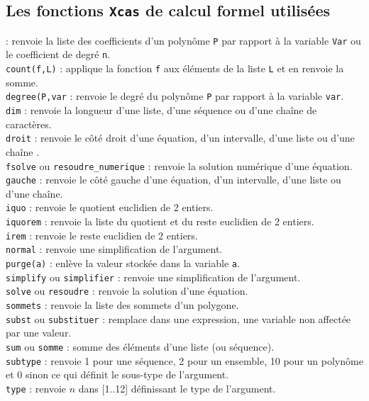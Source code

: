 \documentclass[12pt,a4paper]{book}
\begin{document}
\begin{giacjshere}
\section{Les fonctions {\tt Xcas} de calcul formel utilis\'ees}
 : renvoie la liste des coefficients d'un polynôme
{\tt P} par rapport \`a la variable {\tt Var} ou le coefficient de 
degr\'e {\tt n}.\\
{\tt count(f,L)} : applique la fonction {\tt f} aux \'el\'ements de la liste 
{\tt L} et en renvoie la somme.\\
{\tt degree(P,var} : renvoie le degr\'e du polynôme {\tt P} par rapport à la 
variable {\tt var}.\\
{\tt dim} : renvoie la longueur d'une liste, d'une s\'equence ou d'une cha\^ine de caract\`eres.\\
{\tt droit} : renvoie le c\^ot\'e droit d'une \'equation, d'un intervalle, 
d'une liste ou d'une cha\^ine .\\
{\tt fsolve} ou {\tt resoudre\_numerique} : renvoie la solution num\'erique d'une \'equation. \\
{\tt gauche} : renvoie le c\^ot\'e gauche d'une \'equation, d'un intervalle, 
d'une liste ou d'une cha\^ine.\\
{\tt iquo} : renvoie le quotient euclidien de 2 entiers. \\
{\tt iquorem} : renvoie la liste du quotient et du reste euclidien de 2
entiers.\\
{\tt irem} : renvoie le reste euclidien de 2 entiers.\\
{\tt normal} : renvoie une simplification de l'argument.\\
{\tt purge(a)} : enl\`eve la valeur stock\'ee dans la variable {\tt a}.\\
{\tt simplify} ou {\tt simplifier} : renvoie une simplification de l'argument.\\
{\tt solve} ou {\tt resoudre} : renvoie la solution d'une \'equation.\\
{\tt sommets} : renvoie la liste des sommets d'un polygone.\\
{\tt subst} ou {\tt substituer} : remplace dans une expression, une variable non affect\'ee par 
une valeur.\\
{\tt sum} ou {\tt somme} : somme des \'el\'ements d'une liste (ou s\'equence).\\
{\tt subtype} : renvoie 1 pour une s\'equence, 2 pour un ensemble, 10 pour un 
polyn\^ome et 0 sinon ce qui d\'efinit le sous-type de l'argument.\\
{\tt type} : renvoie $n$ dans [1..12] d\'efinissant le type de l'argument.


\end{giacjshere}
\end{document}
